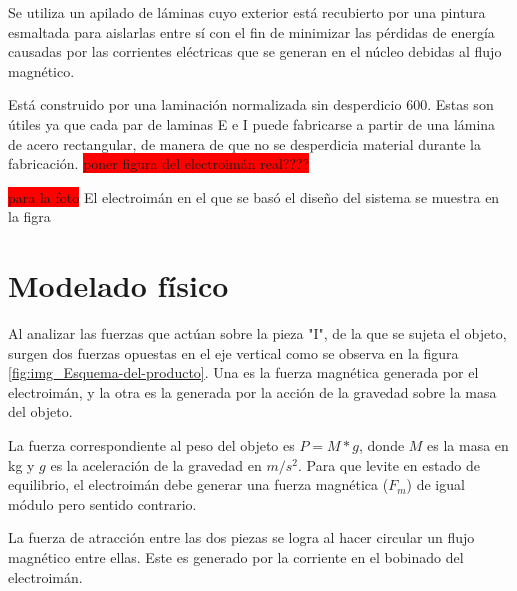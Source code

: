 \noindent Se utiliza un apilado de láminas cuyo exterior está recubierto por una pintura esmaltada para aislarlas entre sí con el fin de minimizar las pérdidas de energía causadas por las corrientes eléctricas que se generan en el núcleo debidas al flujo magnético. 

\noindent Está construido por una laminación normalizada sin desperdicio 600. Estas son útiles ya que cada par de laminas E e I puede fabricarse a partir de una lámina de acero rectangular, de manera de que no se desperdicia material durante la fabricación. 
\colorbox{red}{poner figura del electroimán real????}

\noindent \colorbox{red}{para la foto} El electroimán en el que se basó el diseño del sistema se muestra en la figra

\section{Modelado físico}

\noindent Al analizar las fuerzas que actúan sobre la pieza "I", de la que se sujeta el objeto, surgen dos fuerzas opuestas en el eje vertical como se observa en la figura \ref{fig:img_Esquema-del-producto}. Una es la fuerza magnética generada por el electroimán, y la otra es la generada por la acción de la gravedad sobre la masa del objeto. 
 

\noindent La fuerza correspondiente al peso del objeto es $P=M*g$, donde $M$ es la masa en kg y $g$ es la aceleración de la gravedad en $m/s^2$. Para que levite en estado de equilibrio, el electroimán debe generar una fuerza magnética ($F_{m}$) de igual módulo pero sentido contrario.

\noindent La fuerza de atracción entre las dos piezas se logra al hacer circular un flujo magnético entre ellas. Este es generado por la corriente en el bobinado del electroimán.

